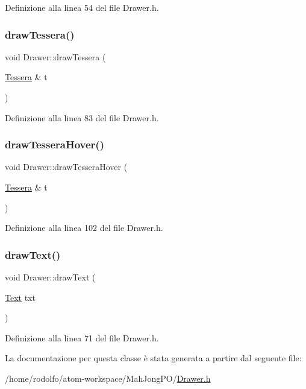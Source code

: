 Definizione alla linea 54 del file Drawer.\+h.

\mbox{\label{class_drawer_a67cd9032cb173644a483a602b1744bdb}} 
\subsubsection{\texorpdfstring{draw\+Tessera()}{drawTessera()}}
{\footnotesize\ttfamily void Drawer\+::draw\+Tessera (\begin{DoxyParamCaption}\item[{\hyperlink{class_tessera}{Tessera} \&}]{t }\end{DoxyParamCaption})\hspace{0.3cm}{\ttfamily [inline]}}



Definizione alla linea 83 del file Drawer.\+h.

\mbox{\label{class_drawer_a636c4671688d289dbbf50f20f7e20b12}} 
\subsubsection{\texorpdfstring{draw\+Tessera\+Hover()}{drawTesseraHover()}}
{\footnotesize\ttfamily void Drawer\+::draw\+Tessera\+Hover (\begin{DoxyParamCaption}\item[{\hyperlink{class_tessera}{Tessera} \&}]{t }\end{DoxyParamCaption})\hspace{0.3cm}{\ttfamily [inline]}}



Definizione alla linea 102 del file Drawer.\+h.

\mbox{\label{class_drawer_a203eca4b4a5c98c73678303bf9e5a23e}} 
\subsubsection{\texorpdfstring{draw\+Text()}{drawText()}}
{\footnotesize\ttfamily void Drawer\+::draw\+Text (\begin{DoxyParamCaption}\item[{\hyperlink{class_text}{Text}}]{txt }\end{DoxyParamCaption})\hspace{0.3cm}{\ttfamily [inline]}}



Definizione alla linea 71 del file Drawer.\+h.



La documentazione per questa classe è stata generata a partire dal seguente file\+:\begin{DoxyCompactItemize}
\item 
/home/rodolfo/atom-\/workspace/\+Mah\+Jong\+P\+O/\hyperlink{_drawer_8h}{Drawer.\+h}\end{DoxyCompactItemize}
